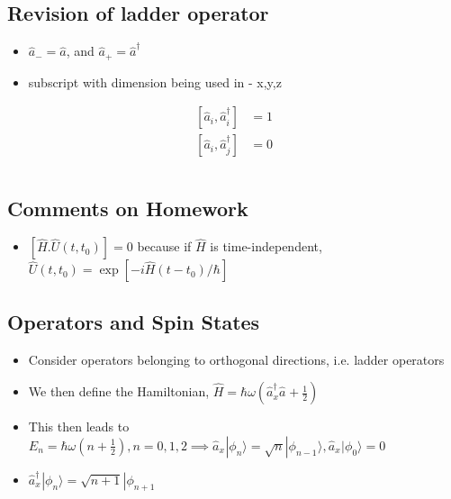 \documentclass[a4paper,11pt,normalem]{article}
\begin{document}
\subsection{Revision of ladder operator}\label{revision-of-ladder-operator}

\begin{itemize}
\item
  \(\hat{a}_{-} = \hat{a}\), and \(\hat{a}_{+} = \hat{a}^\dagger\)
\item
  subscript with dimension being used in - x,y,z
\end{itemize}

\[
    \begin{aligned}
    [\hat{a}_i,\hat{a}_i^\dagger] &= 1 \\
    [\hat{a}_i,\hat{a}_j^\dagger] &= 0
    \end{aligned}
\]

\section{}\label{lecture-16}

\subsection{Comments on Homework}\label{comments-on-homework}

\begin{itemize}
\item
  \([\hat{H}.\hat{U}(t,t_0)] = 0\) because if \(\hat{H}\) is
  time-independent, \(\hat{U}(t,t_0) = \exp[-i\hat{H}(t-t_0)/\hbar]\)
\end{itemize}

\subsection{Operators and Spin States}\label{operators-and-spin-states}

\begin{itemize}
\item
  Consider operators belonging to orthogonal directions, i.e. ladder
  operators
\item
  We then define the Hamiltonian,
  \(\hat{H} = \hbar\omega(\hat{a}_{x}^\dagger\hat{a}_{} + \frac{1}{2})\)
\item
  This then leads to
  \(E_n = \hbar\omega(n + \frac{1}{2}), n = 0,1,2 \implies \hat{a}_{x_{}}|\phi_n\rangle = \sqrt{n}|\phi_{n-1_{}}\rangle, \hat{a}_{x_{}}|\phi_0\rangle = 0\)
\item
  \(\hat{a}_{x_{}}^\dagger|\phi_n\rangle = \sqrt{n+1}|\phi_{n+1_{}}\)
\end{itemize}
\end{document}
